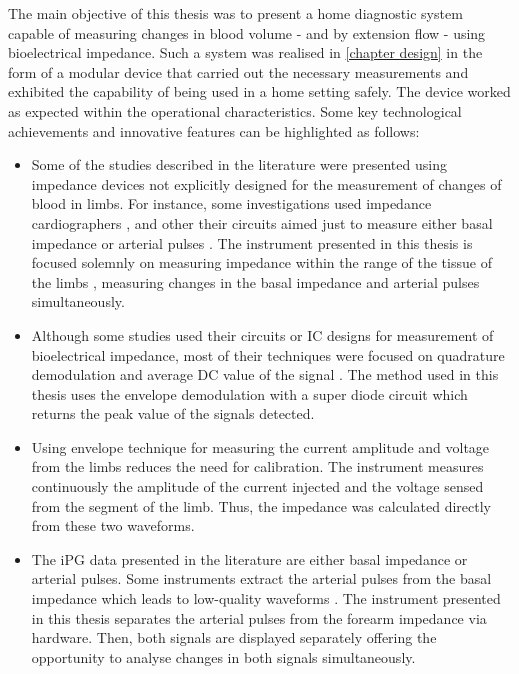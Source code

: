 The main objective of this thesis was to present a home diagnostic system capable of measuring changes in blood volume - and by extension flow - using bioelectrical impedance. Such a system was realised in \ref{chapter design} in the form of a modular device that carried out the necessary measurements and exhibited the capability of being used in a home setting safely. The device worked as expected within the operational characteristics. Some key technological achievements and innovative features can be highlighted as follows: 

\begin{itemize}
	\item Some of the studies described in the literature were presented using impedance devices not explicitly designed for the measurement of changes of blood in limbs. For instance, some investigations used impedance cardiographers \cite{porter1985measurement, distefano1973bioelectrical, yamamoto1992impedance, couch1971noninvasive}, and other their circuits aimed just to measure either basal impedance \cite{mohapatra1979measurement, yamakoshi1980limb, nyober1950electrical, yamakoshi1978admittance, yamamoto1992impedance} or arterial pulses \cite{mohapatra1979measurement, costeloe1980continuous, corciova2011peripheral, brown1975impedance, wang2011development,yamamoto1992impedance}. The instrument presented in this thesis is focused solemnly on measuring impedance within the range of the tissue of the limbs \cite{gabriel1996dielectric}, measuring changes in the basal impedance and arterial pulses simultaneously. 
	\item Although some studies used their circuits or IC designs for measurement of bioelectrical impedance, most of their techniques were focused on quadrature demodulation and average DC value of the signal \cite{yufera2002integrated, pallas1993bioelectric, min2000lock}. The method used in this thesis uses the envelope demodulation with a super diode circuit which returns the peak value of the signals detected.
	\item Using envelope technique for measuring the current amplitude and voltage from the limbs reduces the need for calibration. The instrument measures continuously the amplitude of the current injected and the voltage sensed from the segment of the limb. Thus, the impedance was calculated directly from these two waveforms. 
	\item The iPG data presented in the literature are either basal impedance or arterial pulses. Some instruments extract the arterial pulses from the basal impedance which leads to low-quality waveforms \cite{mohapatra1979measurement, yamamoto1992impedance}. The instrument presented in this thesis separates the arterial pulses from the forearm impedance via hardware. Then, both signals are displayed separately offering the opportunity to analyse changes in both signals simultaneously.
\end{itemize} 

